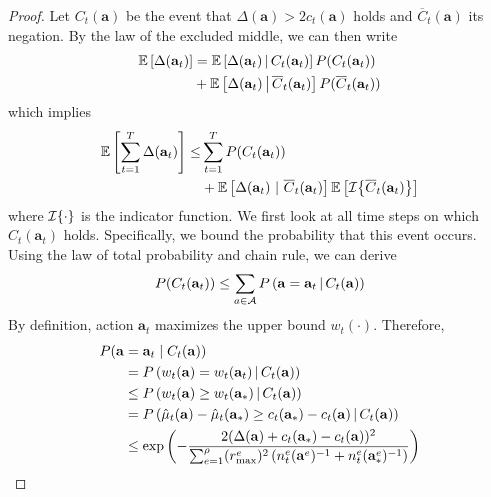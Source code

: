 \begin{proof}
Let $C_t(\mathbf{a})$ be the event that $\Delta(\mathbf{a}) > 2 c_t(\mathbf{a})$ holds and $\overline{C}_t(\mathbf{a})$ its negation. By the law of the excluded middle, we can then write
\begin{align*}
\mathbb{E}\left[\Delta(\mathbf{a}_t)\right] &=
\mathbb{E}\left[ \Delta(\mathbf{a}_t) \,\middle|\, C_t(\mathbf{a}_t) \right] P(C_t(\mathbf{a}_t)) \\
& +\mathbb{E}\left[ \Delta(\mathbf{a}_t) \,\middle|\, \overline{C}_t(\mathbf{a}_t) \right] P(\overline{C}_t(\mathbf{a}_t))
\end{align*}
which implies
\begin{equation}
\begin{split}
\mathbb{E} \left[ \sum_{t=1}^T \Delta(\mathbf{a}_t) \right] \le &\sum_{t=1}^T P(C_t(\mathbf{a}_t))
\\&+ \mathbb{E}\left[\Delta(\mathbf{a}_t)\ |\ \overline{C}_t(\mathbf{a}_t)\right]\mathbb{E}\left[\ind{\overline{C}_t(\mathbf{a}_t)}\right]\nonumber
\label{decomp}
\end{split}
\end{equation}
where $\mathcal{I}\!\left\{\cdot\right\}$ is the indicator function.
%
We first look at all time steps on which $C_t(\mathbf{a}_t)$ holds.
Specifically, we bound the probability that this event occurs. Using the law of total probability and chain rule, we can derive
\begin{align}
P(C_t(\mathbf{a}_t)) \le  \sum_{a \in \mathcal{A}} P\left(  \mathbf{a} = \mathbf{a}_t \,\middle|\, C_t(\mathbf{a})  \right) \label{eq:sumPC}
\end{align}
By definition, action $\mathbf{a}_t$ maximizes the upper bound $w_t(\cdot)$. Therefore,
\begin{equation*}
\begin{split}
P(\mathbf{a} &= \mathbf{a}_t \mid C_t(\mathbf{a}))\\
&= \prob{ w_t(\mathbf{a}) = w_t(\mathbf{a}_t)  \md C_t(\mathbf{a}) }\\
&\le \prob{ w_t(\mathbf{a}) \ge w_t(\mathbf{a}_*)  \md C_t(\mathbf{a}) }\\
& = \prob{ \hat{\mu}_t(\mathbf{a}) - \hat{\mu}_t(\mathbf{a}_*) \ge c_t(\mathbf{a}_*) - c_t(\mathbf{a}) \md C_t(\mathbf{a}) }\\
&\le \text{exp}\left( -\frac{ 2 ( \Delta(\mathbf{a}) + c_t(\mathbf{a}_*) - c_t(\mathbf{a}) )^2 }{ \sum_{e=1}^\rho (r_{\max}^e)^2 \left( n^e_t(\mathbf{a}^e)^{-1} + n^e_t(\mathbf{a}^e_*)^{-1} \right) } \right)

\end{split}
\end{equation*}
\end{proof}

